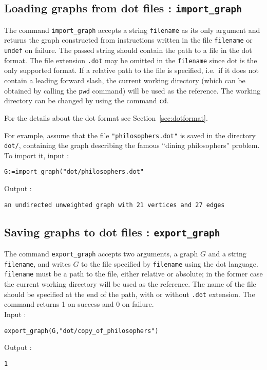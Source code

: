 \documentclass[a4paper,11pt]{article}
\begin{document}
\subsection{Loading graphs from {\sf dot} files : {\tt import\_graph}}

The command {\tt import\_graph} accepts a string {\tt filename} as its only argument and returns the graph constructed from instructions written in the file {\tt filename} or {\tt undef} on failure. The passed string should contain the path to a file in the {\sf dot} format. The file extension {\tt .dot} may be omitted in the {\tt filename} since {\sf dot} is the only supported format. If a relative path to the file is specified, i.e.~if it does not contain a leading forward slash, the current working directory (which can be obtained by calling the {\tt pwd} command) will be used as the reference. The working directory can be changed by using the command {\tt cd}.

For the details about the {\sf dot} format see Section~\ref{sec:dotformat}.

For example, assume that the file {\tt "philosophers.dot"} is saved in the directory {\tt dot/}, containing the graph describing the famous ``dining philosophers'' problem. To import it, input :
\begin{center}
  \tt G:=import\_graph("dot/philosophers.dot"
\end{center}
Output :
\begin{center}
  \tt an undirected unweighted graph with 21 vertices and 27 edges
\end{center}

\subsection{Saving graphs to {\sf dot} files : {\tt export\_graph}}

The command {\tt export\_graph} accepts two arguments, a graph $ G $ and a string {\tt filename}, and writes $ G $ to the file specified by {\tt filename} using the {\sf dot} language. {\tt filename} must be a path to the file, either relative or absolute; in the former case the current working directory will be used as the reference. The name of the file should be specified at the end of the path, with or without {\tt .dot} extension. The command returns 1 on success and 0 on failure.\\
Input :
\begin{center}
  \tt export\_graph(G,"dot/copy\_of\_philosophers")
\end{center}
Output :
\begin{center}
  \tt 1
\end{center}
\end{document}
